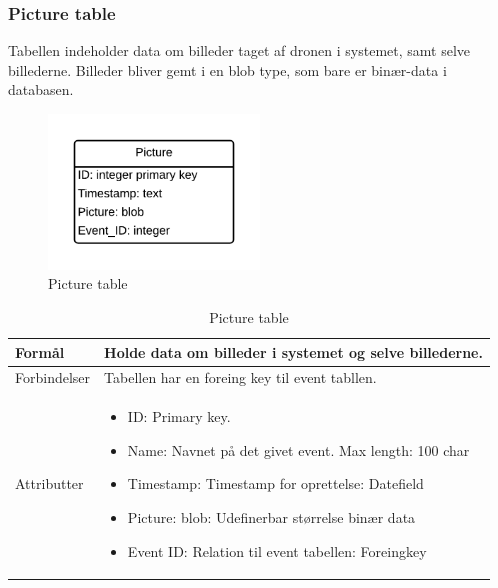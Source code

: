 \subsubsection{Picture table}
Tabellen indeholder data om billeder taget af dronen i systemet, samt selve billederne. Billeder bliver gemt i en blob type, som bare er binær-data i databasen.
\vspace{-5pt}
\begin{figure}[H]
	\centering
	\includegraphics[width=0.5\textwidth]{Billeder/database/PictureTable.png}
	\vspace{-5pt}
	\caption{Picture table}
	\label{fig:picture_table}
\end{figure}

\begin{table}[H]
\begin{tabular}{| p{3cm}| p{11.5cm}|}
\hline

Formål	 							& Holde data om billeder i systemet og selve billederne.\\\hline
Forbindelser						& Tabellen har en foreing key til event tabllen.\\\hline
Attributter						& \begin{itemize}
												\item ID: Primary key.
												\item Name: Navnet på det givet event. Max length: 100 char
												\item Timestamp: Timestamp for oprettelse: Datefield
												\item Picture: blob: Udefinerbar størrelse binær data
												\item Event ID: Relation til event tabellen: Foreingkey
											\end{itemize} \\\hline 
\end{tabular}
\caption{Picture table}
\label{tab:picture_table}
\end{table}